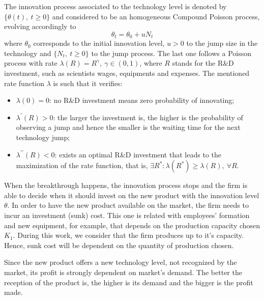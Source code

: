 The innovation process associated to the technology level is denoted by $\{ \theta(t), \ t \geq 0 \}$ and considered to be an homogeneous Compound Poisson process, evolving accordingly to
$$\theta_t= \theta_0+ u N_t$$  
where $\theta_0$ corresponds to the initial innovation level, $u > 0$ to the jump size in the technology and $\{N_t, \ t \geq 0\}$  to the jump process. The last one follows a Poisson process with rate $\lambda(R)=R^\gamma, \ \gamma \in (0,1)$, where $R$ stands for the R\&D investment, such as scientists wages, equipments and expenses. The mentioned rate function $\lambda$ is such that it verifies:
\begin{itemize}
	\item $\lambda(0) = 0$: no R\&D investment means zero probability of innovating;
	\item $\lambda^\prime (R)>0$: the larger the investment is, the higher is the probability of observing a jump and hence the smaller is the waiting time for the next technology jump;
	\item $ \lambda ^{ \prime \prime} (R)<0$: exists an optimal R\&D investment that leads to the maximization of the rate function, that is, $\exists R^*: \lambda(R^*)\geq \lambda(R), \  \forall R$.
\end{itemize}


When the breakthrough happens, the innovation process stops and the firm is able to decide when it should invest on the new product with the innovation level $\theta$. In order to have the new product available on the market, the firm needs to incur an investment (sunk) cost. This one is related with employees' formation and new equipment, for example, that depends on the production capacity chosen $K_1$. During this work, we consider that the firm produces up to it's capacity. Hence, sunk cost will be dependent on the quantity of production chosen.

Since the new product offers a new technology level, not recognized by the market, its profit is strongly dependent on market's demand. The better the reception of the product is, the higher is its demand and the bigger is the profit made. 

